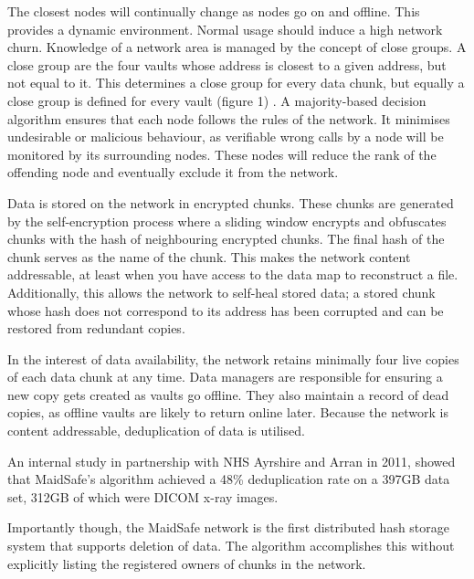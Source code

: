 \documentclass[twocolumn,english]{article}
\begin{document}
The closest nodes will continually change as nodes go on and offline. This provides a dynamic environment.  Normal usage should  induce a high network churn. Knowledge of a network area is managed by the concept of close groups.  A close group are the four vaults whose address is closest to a given address, but not equal to it.  This determines a close group for every data chunk, but equally a close group is defined for every vault (figure 1) . A majority-based decision algorithm ensures that each node follows the rules of the network. It minimises undesirable or malicious behaviour, as verifiable wrong calls by a node will be monitored by its surrounding nodes.  These nodes will reduce the rank of the offending node and eventually exclude it from the network.\cite{msVault} 

Data is stored on the network in encrypted chunks. These chunks are generated by the self-encryption process where a sliding window encrypts and obfuscates chunks with the hash of neighbouring encrypted chunks. The final hash of the chunk serves as the name of the chunk.  This makes the network content addressable, at least when you have access to the data map to reconstruct a file\cite{msEncrypt}. Additionally, this allows the network to self-heal stored data; a stored chunk whose hash does not correspond to its address has been corrupted and can be restored from redundant copies.

In the interest of data availability, the network retains minimally four live
copies of each data chunk at any time. Data managers are responsible for ensuring a new copy gets created as vaults go offline.  They also maintain a record of dead copies, as offline vaults are likely to return online later.  Because the network is content addressable, deduplication of data is utilised.

An internal study in partnership with NHS Ayrshire and Arran in 2011, showed that MaidSafe's algorithm achieved a 48\% deduplication rate on a 397GB data set, 312GB of which were DICOM x-ray images.

Importantly though, the MaidSafe network is the first distributed hash storage system that supports deletion of data.  The algorithm accomplishes this without explicitly listing the registered owners of chunks in the network. 


\end{document}

